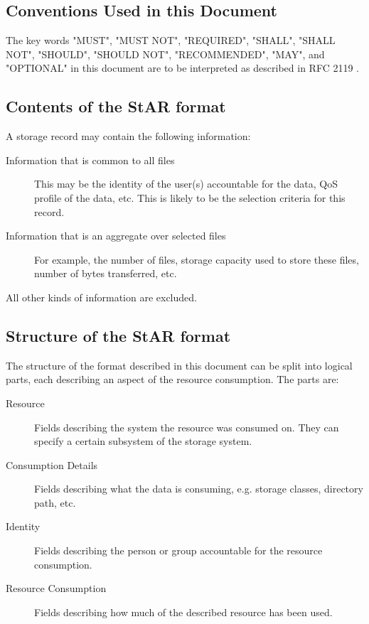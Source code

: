 \subsection{Conventions Used in this Document}
The key words "MUST", "MUST NOT", "REQUIRED", "SHALL", "SHALL NOT", 
"SHOULD", "SHOULD NOT", "RECOMMENDED",  "MAY", and 
"OPTIONAL" in this document are to be interpreted as described in
RFC 2119 \cite{rfc2119}.


\subsection{Contents of the StAR format}
A storage record may contain the following information:
\begin{description}
\item[Information that is common to all files] This may be the identity of the
user(s) accountable for the data, QoS profile of the data, etc. This is likely
to be the selection criteria for this record.
\item[Information that is an aggregate over selected files] For example, the 
number of files, storage capacity used to store these files, number of bytes 
transferred, etc. 
\end{description}
All other kinds of information are excluded.

\subsection{Structure of the StAR format}

The structure of the format described in this document can be split into
logical parts, each describing an aspect of the resource consumption. 
The parts are:

\begin{description}

\item[Resource] Fields describing the system the resource was consumed on. They 
can specify a certain subsystem of the storage system.

\item[Consumption Details] Fields describing what the data is consuming, e.g. 
storage classes, directory path, etc.

\item[Identity] Fields describing the person or group accountable for the
resource consumption.

\item[Resource Consumption] Fields describing how much of the described
resource has been used.

\end{description}

